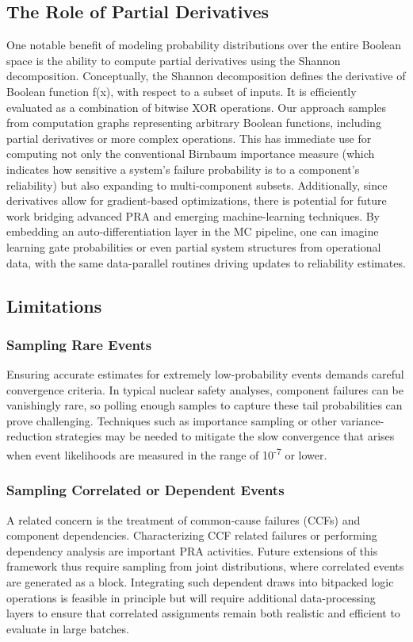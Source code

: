 \subsection*{The Role of Partial Derivatives}
One notable benefit of modeling probability distributions over the entire Boolean space is the ability to compute partial derivatives using the Shannon decomposition. Conceptually, the Shannon decomposition defines the derivative of Boolean function f(x), with respect to a subset of inputs. It is efficiently evaluated as a combination of bitwise XOR operations. Our approach samples from computation graphs representing arbitrary Boolean functions, including partial derivatives or more complex operations. This has immediate use for computing not only the conventional Birnbaum importance measure (which indicates how sensitive a system’s failure probability is to a component’s reliability) but also expanding to multi-component subsets. Additionally, since derivatives allow for gradient-based optimizations, there is potential for future work bridging advanced PRA and emerging machine-learning techniques. By embedding an auto-differentiation layer in the MC pipeline, one can imagine learning gate probabilities or even partial system structures from operational data, with the same data-parallel routines driving updates to reliability estimates.

\subsection*{Limitations}
\subsubsection*{Sampling Rare Events}
Ensuring accurate estimates for extremely low-probability events demands careful convergence criteria. In typical nuclear safety analyses, component failures can be vanishingly rare, so polling enough samples to capture these tail probabilities can prove challenging. Techniques such as importance sampling or other variance-reduction strategies may be needed to mitigate the slow convergence that arises when event likelihoods are measured in the range of 10\textsuperscript{-7} or lower. 

\subsubsection*{Sampling Correlated or Dependent Events}
A related concern is the treatment of common-cause failures (CCFs) and component dependencies. Characterizing CCF related failures or performing dependency analysis are important PRA activities. Future extensions of this framework thus require sampling from joint distributions, where correlated events are generated as a block. Integrating such dependent draws into bitpacked logic operations is feasible in principle but will require additional data-processing layers to ensure that correlated assignments remain both realistic and efficient to evaluate in large batches.

